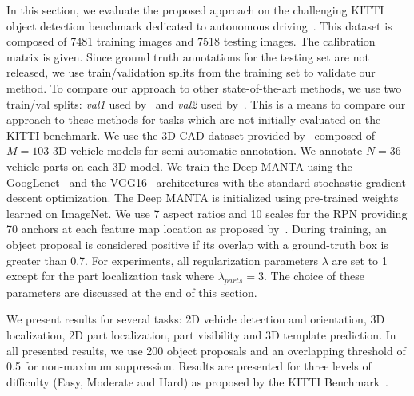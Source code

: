 \documentclass[10pt,twocolumn,letterpaper]{article}
\begin{document}
In this section, we evaluate the proposed approach on the challenging KITTI object detection benchmark dedicated to autonomous driving~\cite{kitti}. This dataset is composed of 7481 training images and 7518 testing images. The calibration matrix is given. Since ground truth annotations for the testing set are not released, we use train/validation splits from the training set to validate our method. To compare our approach to other state-of-the-art methods, we use two train/val splits: \textit{val1} used by~\cite{subcnn,3dvp} and \textit{val2} used by~\cite{3dop,mono3d}. This is a means to compare our approach to these methods for tasks which are not initially evaluated on the KITTI benchmark. We use the 3D CAD dataset provided by~\cite{cuboid,MTurkers} composed of $M=103$ 3D vehicle models for semi-automatic annotation. We annotate $N=36$ vehicle parts on each 3D model. We train the Deep MANTA using the GoogLenet~\cite{gn} and the VGG16~\cite{vgg} architectures with the standard stochastic gradient descent optimization. The Deep MANTA is initialized using pre-trained weights learned on ImageNet. We use 7 aspect ratios and 10 scales for the RPN providing 70 anchors at each feature map location as proposed by~\cite{subcnn}. During training, an object proposal is considered positive if its overlap with a ground-truth box is greater than 0.7. For experiments, all regularization parameters $\lambda$ are set to 1 except for the part localization task where $\lambda_{parts} = 3$. The choice of these parameters are discussed at the end of this section.

We present results for several tasks: 2D vehicle detection and orientation, 3D localization, 2D part localization, part visibility and 3D template prediction. In all presented results, we use 200 object proposals and an overlapping threshold of 0.5 for non-maximum suppression. Results are presented for three levels of difficulty (Easy, Moderate and Hard) as proposed by the KITTI Benchmark~\cite{kitti}.
\end{document}
